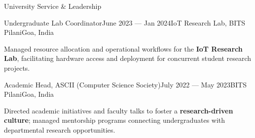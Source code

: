 
\begin{rSection}{University Service \& Leadership}

    \begin{rSubsection}{Undergraduate Lab Coordinator}{June 2023 --- Jan 2024}{IoT Research Lab, BITS Pilani}{Goa, India}
        \item Managed resource allocation and operational workflows for the \textbf{IoT Research Lab}, facilitating hardware access and deployment for concurrent student research projects.
    \end{rSubsection}

    \begin{rSubsection}{Academic Head, ASCII (Computer Science Society)}{July 2022 --- May 2023}{BITS Pilani}{Goa, India}
        \item Directed academic initiatives and faculty talks to foster a \textbf{research-driven culture}; managed mentorship programs connecting undergraduates with departmental research opportunities.
    \end{rSubsection}

\end{rSection}